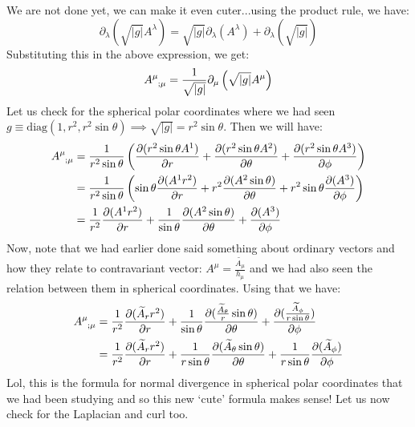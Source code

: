 We are not done yet, we can make it even cuter...using the product rule, we have:
$$\partial_\lambda (\sqrt{|g|}A^\lambda) =\sqrt{|g|} \partial_\lambda (A^\lambda)+ \partial_\lambda (\sqrt{|g|}) $$
Substituting this in the above expression, we get: 
$$\tensor{A}{^\mu _{; \mu}} =  \frac{1}{\sqrt{|g|}}\partial_\mu \brac{\sqrt{|g|}A^\mu}$$
Let us check for the spherical polar coordinates where we had seen $g \equiv \mathrm{diag}(1, r^2, r^2\sin\theta) \implies \sqrt{|g|} = r^2 \sin\theta$. Then we will have:
\begin{align*}
    \tensor{A}{^\mu _{; \mu}} &= \frac{1}{r^2 \sin\theta}\brac{\pdv{(r^2\sin\theta A^1)}{r}+\pdv{(r^2\sin\theta A^2)}{\theta}+\pdv{(r^2\sin\theta A^3)}{\phi}}\\
    &=\frac{1}{r^2 \sin\theta}\brac{\sin\theta \pdv{(A^1r^2)}{r}+r^2\pdv{(A^2\sin\theta )}{\theta}+r^2\sin\theta\pdv{( A^3)}{\phi}}\\
   &= {\frac{1}{r^2} \pdv{(A^1r^2)}{r}+\frac{1}{\sin\theta}\pdv{(A^2\sin\theta )}{\theta}+\pdv{( A^3)}{\phi}}
\end{align*}
Now, note that we had earlier done said something about ordinary vectors and how they relate to contravariant vector: $A^\mu = \frac{\widetilde{A_\mu}}{h_\mu}$ and we had also seen the relation between them in spherical coordinates. Using that we have:
\begin{align*}
    \tensor{A}{^\mu _{; \mu}} &= {\frac{1}{r^2} \pdv{(\widetilde{A}_r r^2)}{r}+\frac{1}{\sin\theta}\pdv{(\frac{\widetilde{A}_\theta}{r}\sin\theta )}{\theta}+\pdv{(\frac{\widetilde{A}_\phi}{r\sin\theta})}{\phi}}\\
    &={\frac{1}{r^2} \pdv{(\widetilde{A}_r r^2)}{r}+\frac{1}{r\sin\theta}\pdv{({\widetilde{A}_\theta}\sin\theta )}{\theta}+\frac{1}{{r\sin\theta}}\pdv{({\widetilde{A}_\phi})}{\phi}}
\end{align*}
Lol, this is the formula for normal divergence in spherical polar coordinates that we had been studying and so this new `cute' formula makes sense! Let us now check for the Laplacian and curl too. 
